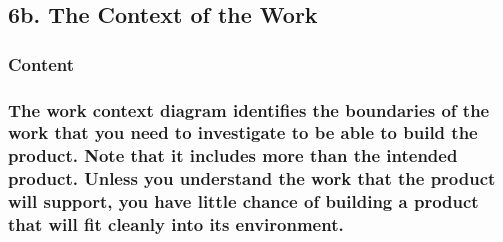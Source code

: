 \documentclass[
]{article}
\begin{document}
\hypertarget{b.-the-context-of-the-work}{%
\subsection{6b. The Context of the
Work}\label{b.-the-context-of-the-work}}

\hypertarget{content-23}{%
\subsubsection{Content}\label{content-23}}

\hypertarget{the-work-context-diagram-identifies-the-boundaries-of-the-work-that-you-need-to-investigate-to-be-able-to-build-the-product.-note-that-it-includes-more-than-the-intended-product.-unless-you-understand-the-work-that-the-product-will-support-you-have-little-chance-of-building-a-product-that-will-fit-cleanly-into-its-environment.}{%
\subsubsection{The work context diagram identifies the boundaries of the
work that you need to investigate to be able to build the product. Note
that it includes more than the intended product. Unless you understand
the work that the product will support, you have little chance of
building a product that will fit cleanly into its
environment.}\label{the-work-context-diagram-identifies-the-boundaries-of-the-work-that-you-need-to-investigate-to-be-able-to-build-the-product.-note-that-it-includes-more-than-the-intended-product.-unless-you-understand-the-work-that-the-product-will-support-you-have-little-chance-of-building-a-product-that-will-fit-cleanly-into-its-environment.}}
\end{document}
